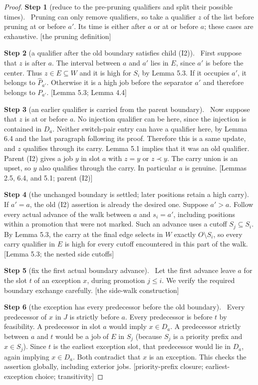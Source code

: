 \documentclass[11pt,a4paper]{article}
\theoremstyle{plain}
\theoremstyle{definition}
\newcommand{\step}[2]{\par\smallskip\noindent\textbf{Step #1} (#2).\ \ignorespaces}
\newcommand{\by}[1]{{\small[#1]}}
\begin{document}
\begin{proof}
\step{1}{reduce to the pre-pruning qualifiers and split their possible times}
Pruning can only remove qualifiers, so take a qualifier \(z\) of the list before pruning at or before \(a'\). Its time is either after \(a\) or at or before \(a\); these cases are exhaustive.
\by{the pruning definition}

\step{2}{a qualifier after the old boundary satisfies child (I2)}
First suppose that \(z\) is after \(a\). The interval between \(a\) and \(a'\) lies in \(E\), since \(a'\) is before the center. Thus \(z\in E\subseteq W\) and it is high for \(S_i\) by Lemma 5.3. If it occupies \(a'\), it belongs to \(\widehat P_{a'}\). Otherwise it is a high job before the separator \(a'\) and therefore belongs to \(P_{a'}\).
\by{Lemma 5.3; Lemma 4.4}

\step{3}{an earlier qualifier is carried from the parent boundary}
Now suppose that \(z\) is at or before \(a\). No injection qualifier can be here, since the injection is contained in \(D_a\). Neither switch-pair entry can have a qualifier here, by Lemma 6.4 and the last paragraph following its proof. Therefore this is a same update, and \(z\) qualifies through its carry. Lemma 5.1 implies that it was an old qualifier. Parent (I2) gives a job \(y\) in slot \(a\) with \(z=y\) or \(z\prec y\). The carry union is an upset, so \(y\) also qualifies through the carry. In particular \(a\) is genuine.
\by{Lemmas 2.5, 6.4, and 5.1; parent (I2)}

\step{4}{the unchanged boundary is settled; later positions retain a high carry}
If \(a'=a\), the old (I2) assertion is already the desired one. Suppose \(a'>a\). Follow every actual advance of the walk between \(a\) and \(s_i=a'\), including positions within a promotion that were not marked. Such an advance uses a cutoff \(S_j\subseteq S_i\). By Lemma 5.3, the carry at the final edge selects in \(W\) exactly \(O\setminus S_i\), so every carry qualifier in \(E\) is high for every cutoff encountered in this part of the walk.
\by{Lemma 5.3; the nested side cutoffs}

\step{5}{fix the first actual boundary advance}
Let the first advance leave \(a\) for the slot \(t\) of an exception \(x\), during promotion \(j\leq i\). We verify the required boundary exchange carefully.
\by{the side-walk construction}

\step{6}{the exception has every predecessor before the old boundary}
Every predecessor of \(x\) in \(J\) is strictly before \(a\). Every predecessor is before \(t\) by feasibility. A predecessor in slot \(a\) would imply \(x\in D_a\). A predecessor strictly between \(a\) and \(t\) would be a job of \(E\) in \(S_j\) (because \(S_j\) is a priority prefix and \(x\in S_j\)). Since \(t\) is the earliest exception slot, that predecessor would lie in \(D_a\), again implying \(x\in D_a\). Both contradict that \(x\) is an exception. This checks the assertion globally, including exterior jobs.
\by{priority-prefix closure; earliest-exception choice; transitivity}


\end{proof}
\end{document}
